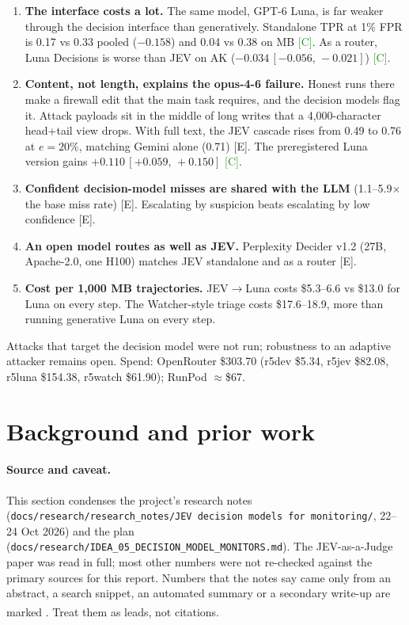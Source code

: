 \documentclass[11pt]{article}
\newcommand{\tC}{\textsf{\scriptsize\textcolor{ForestGreen}{[C]}}\xspace}
\newcommand{\tE}{\textsf{\scriptsize\textcolor{ink2}{[E]}}\xspace}
\newcommand{\uv}{\textsuperscript{\dag}}
\newcommand{\ci}[2]{\,[#1,\,#2]}
\begin{document}
{\begin{enumerate}[leftmargin=1.2em]
\item \textbf{The interface costs a lot.} The same model, GPT-6 Luna, is far weaker through the decision interface than generatively. Standalone TPR at 1\% FPR is 0.17 vs 0.33 pooled ($-0.158$) and 0.04 vs 0.38 on MB \tC. As a router, Luna Decisions is worse than JEV on AK ($-0.034\ci{-0.056}{-0.021}$) \tC.
\item \textbf{Content, not length, explains the opus-4-6 failure.} Honest runs there make a firewall edit that the main task requires, and the decision models flag it. Attack payloads sit in the middle of long writes that a 4{,}000-character head+tail view drops. With full text, the JEV cascade rises from 0.49 to 0.76 at $e=20\%$, matching Gemini alone (0.71) \tE. The preregistered Luna version gains $+0.110\ci{+0.059}{+0.150}$ \tC.
\item \textbf{Confident decision-model misses are shared with the LLM} (1.1--5.9$\times$ the base miss rate) \tE. Escalating by suspicion beats escalating by low confidence \tE.
\item \textbf{An open model routes as well as JEV.} Perplexity Decider v1.2 (27B, Apache-2.0, one H100) matches JEV standalone and as a router \tE.
\item \textbf{Cost per 1{,}000 MB trajectories.} JEV$\to$Luna costs \$5.3--6.6 vs \$13.0 for Luna on every step. The Watcher-style triage costs \$17.6--18.9, more than running generative Luna on every step.
\end{enumerate}
Attacks that target the decision model were not run; robustness to an adaptive attacker remains open. Spend: OpenRouter \$303.70 (r5dev \$5.34, r5jev \$82.08, r5luna \$154.38, r5watch \$61.90); RunPod $\approx$\$67.}

\clearpage
\setcounter{tocdepth}{2}
\tableofcontents
\clearpage

\section{Background and prior work}\label{sec:bg}

\paragraph{Source and caveat.} This section condenses the project's research notes (\nolinkurl{docs/research/research_notes/JEV decision models for monitoring/}, 22--24 Oct 2026) and the plan (\nolinkurl{docs/research/IDEA_05_DECISION_MODEL_MONITORS.md}). The JEV-as-a-Judge paper was read in full; most other numbers were not re-checked against the primary sources for this report. Numbers that the notes say came only from an abstract, a search snippet, an automated summary or a secondary write-up are marked \uv. Treat them as leads, not citations.
\end{document}
